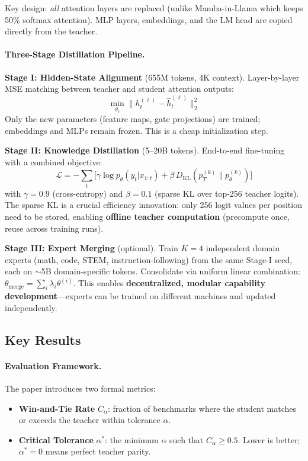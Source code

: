 \documentclass[11pt]{article}
\begin{document}
Key design: \emph{all} attention layers are replaced (unlike Mamba-in-Llama which keeps 50\% softmax attention). MLP layers, embeddings, and the LM head are copied directly from the teacher.

\paragraph{Three-Stage Distillation Pipeline.}

\textbf{Stage I: Hidden-State Alignment} (655M tokens, 4K context).
Layer-by-layer MSE matching between teacher and student attention outputs:
\[
\min_{\theta_\ell} \| h_t^{(\ell)} - \hat{h}_t^{(\ell)} \|_2^2
\]
Only the new parameters (feature maps, gate projections) are trained; embeddings and MLPs remain frozen. This is a cheap initialization step.

\textbf{Stage II: Knowledge Distillation} (5--20B tokens).
End-to-end fine-tuning with a combined objective:
\[
\mathcal{L} = -\sum_t \Big[ \gamma \log p_\theta(y_t | x_{1:t}) + \beta\, D_{\mathrm{KL}}\!\left(p_T^{(k)} \| p_\theta^{(k)}\right) \Big]
\]
with $\gamma = 0.9$ (cross-entropy) and $\beta = 0.1$ (sparse KL over top-256 teacher logits).
The sparse KL is a crucial efficiency innovation: only 256 logit values per position need to be stored, enabling \textbf{offline teacher computation} (precompute once, reuse across training runs).

\textbf{Stage III: Expert Merging} (optional).
Train $K=4$ independent domain experts (math, code, STEM, instruction-following) from the same Stage-I seed, each on $\sim$5B domain-specific tokens.
Consolidate via uniform linear combination: $\theta_{\mathrm{merge}} = \sum_i \lambda_i \theta^{(i)}$.
This enables \textbf{decentralized, modular capability development}---experts can be trained on different machines and updated independently.

\subsection{Key Results}

\paragraph{Evaluation Framework.}
The paper introduces two formal metrics:
\begin{itemize}
    \item \textbf{Win-and-Tie Rate} $C_\alpha$: fraction of benchmarks where the student matches or exceeds the teacher within tolerance $\alpha$.
    \item \textbf{Critical Tolerance} $\alpha^*$: the minimum $\alpha$ such that $C_\alpha \geq 0.5$. Lower is better; $\alpha^* = 0$ means perfect teacher parity.
\end{itemize}
\end{document}
